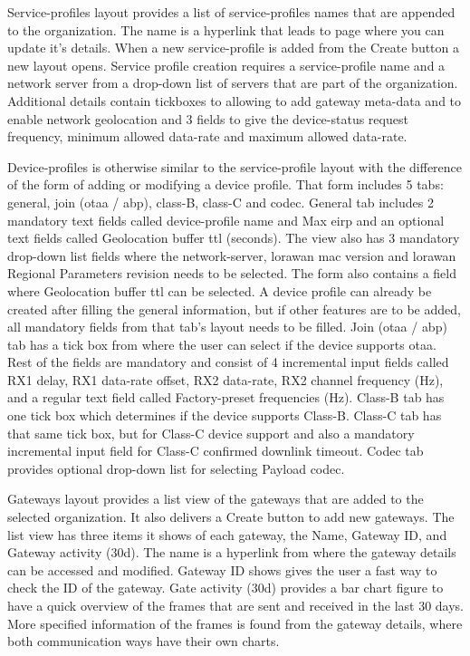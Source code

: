 Service-profiles layout provides a list of service-profiles names that are appended to the organization.
The name is a hyperlink that leads to page where you can update it's details.
When a new service-profile is added from the Create button a new layout opens.
Service profile creation requires a service-profile name and a network server from a drop-down list of servers that are part of the organization.
Additional details contain tickboxes to allowing to add gateway meta-data and to enable network geolocation and 3 fields to give the device-status request frequency, minimum allowed data-rate and maximum allowed data-rate.

Device-profiles is otherwise similar to the service-profile layout with the difference of the form of adding or modifying a device profile.
That form includes 5 tabs: general, join (\gls{otaa} / \gls{abp}), class-B, class-C and codec.
General tab includes 2 mandatory text fields called device-profile name and Max \gls{eirp} and an optional text fields called Geolocation buffer \gls{ttl} (seconds). The view also has 3 mandatory drop-down list fields where the network-server, \gls{lorawan} \gls{mac} version and \gls{lorawan} Regional Parameters revision needs to be selected.
The form also contains a field where Geolocation buffer \gls{ttl} can be selected.
A device profile can already be created after filling the general information, but if other features are to be added, all mandatory fields from that tab's layout needs to be filled.
Join (\gls{otaa} / \gls{abp}) tab has a tick box from where the user can select if the device supports \gls{otaa}.
Rest of the fields are mandatory and consist of 4 incremental input fields called RX1 delay, RX1 data-rate offset, RX2 data-rate, RX2 channel frequency (Hz), and a regular text field called Factory-preset frequencies (Hz).
Class-B tab has one tick box which determines if the device supports Class-B.
Class-C tab  has that same tick box, but for Class-C device support and also a mandatory incremental input field for Class-C confirmed downlink timeout.
Codec tab provides optional drop-down list for selecting Payload codec.

Gateways layout provides a list view of the gateways that are added to the selected organization. 
It also delivers a Create button to add new gateways.
The list view has three items it shows of each gateway, the Name, Gateway ID, and Gateway activity (30d).
The name is a hyperlink from where the gateway details can be accessed and modified.
Gateway ID shows gives the user a fast way to check the ID of the gateway. 
Gate activity (30d) provides a bar chart figure to have a quick overview of the frames that are sent and received in the last 30 days.
More specified information of the frames is found from the gateway details, where both communication ways have their own charts.

